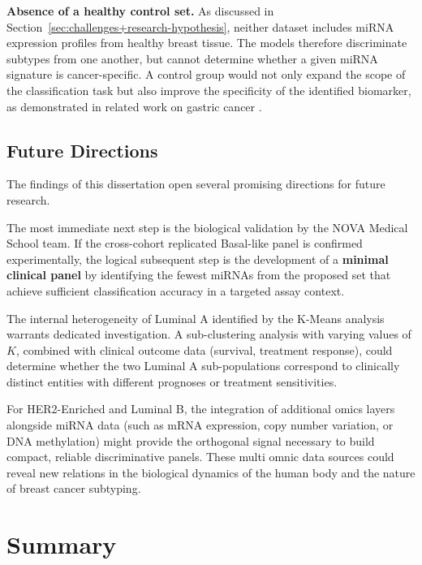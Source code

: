\textbf{Absence of a healthy control set.} As discussed in
Section~\ref{sec:challenges+research-hypothesis}, neither dataset includes miRNA
expression profiles from healthy breast tissue. The models therefore discriminate
subtypes from one another, but cannot determine whether a given miRNA signature is
cancer-specific. A control group would not only expand the scope of the classification
task but also improve the specificity of the identified biomarker, as demonstrated
in related work on gastric cancer \cite{ml_gastric_Azari2023}.
 
\subsection{Future Directions}
\label{subsec:disc_future}
 
The findings of this dissertation open several promising directions for future research.
 
The most immediate next step is the biological validation by the NOVA Medical School
team. If the cross-cohort replicated Basal-like panel is confirmed experimentally,
the logical subsequent step is the development of a \textbf{minimal clinical panel}
by identifying the fewest miRNAs from the proposed set that achieve sufficient
classification accuracy in a targeted assay context.
 
The internal heterogeneity of Luminal A identified by the K-Means analysis warrants
dedicated investigation. A sub-clustering analysis with varying values of $K$,
combined with clinical outcome data (survival, treatment response), could determine
whether the two Luminal A sub-populations correspond to clinically distinct entities
with different prognoses or treatment sensitivities.
 
For HER2-Enriched and Luminal B, the integration of additional omics layers alongside
miRNA data (such as mRNA expression, copy number variation, or DNA methylation)
might provide the orthogonal signal necessary to build compact, reliable discriminative
panels. These multi omnic data sources could reveal new relations in the biological 
dynamics of the human body and the nature of breast cancer subtyping.
 
\section{Summary}
\label{sec:disc_summary}
 
